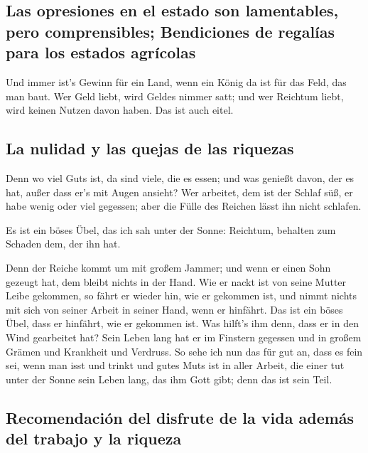 \hypertarget{las-opresiones-en-el-estado-son-lamentables-pero-comprensibles-bendiciones-de-regaluxedas-para-los-estados-agruxedcolas}{%
\subsection{Las opresiones en el estado son lamentables, pero
comprensibles; Bendiciones de regalías para los estados
agrícolas}\label{las-opresiones-en-el-estado-son-lamentables-pero-comprensibles-bendiciones-de-regaluxedas-para-los-estados-agruxedcolas}}

 Und immer ist's Gewinn für ein Land, wenn ein König da
ist für das Feld, das man baut.  Wer Geld liebt, wird
Geldes nimmer satt; und wer Reichtum liebt, wird keinen Nutzen davon
haben. Das ist auch eitel.

\hypertarget{la-nulidad-y-las-quejas-de-las-riquezas}{%
\subsection{La nulidad y las quejas de las
riquezas}\label{la-nulidad-y-las-quejas-de-las-riquezas}}

 Denn wo viel Guts ist, da sind viele, die es essen; und
was genießt davon, der es hat, außer dass er's mit Augen ansieht?
 Wer arbeitet, dem ist der Schlaf süß, er habe wenig oder
viel gegessen; aber die Fülle des Reichen lässt ihn nicht schlafen.

 Es ist ein böses Übel, das ich sah unter der Sonne:
Reichtum, behalten zum Schaden dem, der ihn hat.

 Denn der Reiche kommt um mit großem Jammer; und wenn er
einen Sohn gezeugt hat, dem bleibt nichts in der Hand. 
Wie er nackt ist von seine Mutter Leibe gekommen, so fährt er wieder
hin, wie er gekommen ist, und nimmt nichts mit sich von seiner Arbeit in
seiner Hand, wenn er hinfährt.  Das ist ein böses Übel,
dass er hinfährt, wie er gekommen ist. Was hilft's ihm denn, dass er in
den Wind gearbeitet hat?  Sein Leben lang hat er im
Finstern gegessen und in großem Grämen und Krankheit und Verdruss.
 So sehe ich nun das für gut an, dass es fein sei, wenn
man isst und trinkt und gutes Muts ist in aller Arbeit, die einer tut
unter der Sonne sein Leben lang, das ihm Gott gibt; denn das ist sein
Teil.

\hypertarget{recomendaciuxf3n-del-disfrute-de-la-vida-ademuxe1s-del-trabajo-y-la-riqueza}{%
\subsection{Recomendación del disfrute de la vida además del trabajo y
la
riqueza}\label{recomendaciuxf3n-del-disfrute-de-la-vida-ademuxe1s-del-trabajo-y-la-riqueza}}

